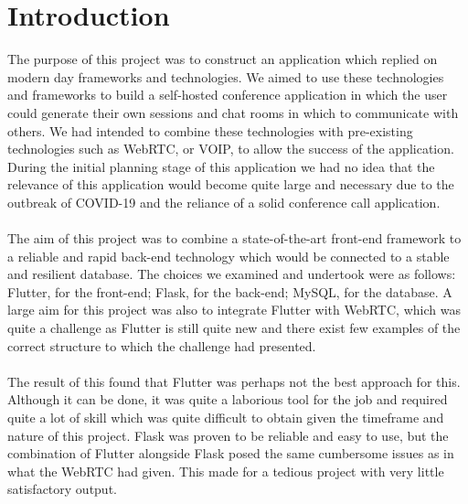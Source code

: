 \chapter{Introduction}
The purpose of this project was to construct an application which replied on modern day frameworks and technologies. We aimed to use these technologies and frameworks to build a self-hosted conference application in which the user could generate their own sessions and chat rooms in which to communicate with others. We had intended to combine these technologies with pre-existing technologies such as WebRTC, or VOIP, to allow the success of the application. During the initial planning stage of this application we had no idea that the relevance of this application would become quite large and necessary due to the outbreak of COVID-19 and the reliance of a solid conference call application.
\\\\ The aim of this project was to combine a state-of-the-art front-end framework to a reliable and rapid back-end technology which would be connected to a stable and resilient database. The choices we examined and undertook were as follows: Flutter, for the front-end; Flask, for the back-end; MySQL, for the database. A large aim for this project was also to integrate Flutter with WebRTC, which was quite a challenge as Flutter is still quite new and there exist few examples of the correct structure to which the challenge had presented.
\\\\ The result of this found that Flutter was perhaps not the best approach for this. Although it can be done, it was quite a laborious tool for the job and required quite a lot of skill which was quite difficult to obtain given the timeframe and nature of this project. Flask was proven to be reliable and easy to use, but the combination of Flutter alongside Flask posed the same cumbersome issues as in what the WebRTC had given. This made for a tedious project with very little satisfactory output. 